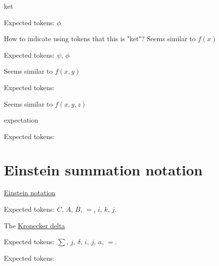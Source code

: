 \documentclass{article}
\begin{document}
\hrulefill


ket

Expected tokens: $\phi$

How to indicate using tokens that this is "ket"? Seems similar to $f(x)$

\hrulefill



Expected tokens: $\psi$, $\phi$

Seems similar to $f(x, y)$

\hrulefill



Expected tokens: 

Seems similar to $f(x, y, z)$

\hrulefill


expectation

Expected tokens: 

\hrulefill


\section{Einstein summation notation}


\href{https://en.wikipedia.org/wiki/Einstein_notation}{Einstein notation}


Expected tokens: $C$, $A$, $B$, $=$, $i$, $k$, $j$.

\hrulefill


The \href{https://en.wikipedia.org/wiki/Kronecker_delta}{Kronecker delta}

Expected tokens: $\sum$, $j$, $\delta$, $i$, $j$, $a$, $=$.

\hrulefill




Expected tokens: 

\hrulefill
\end{document}

